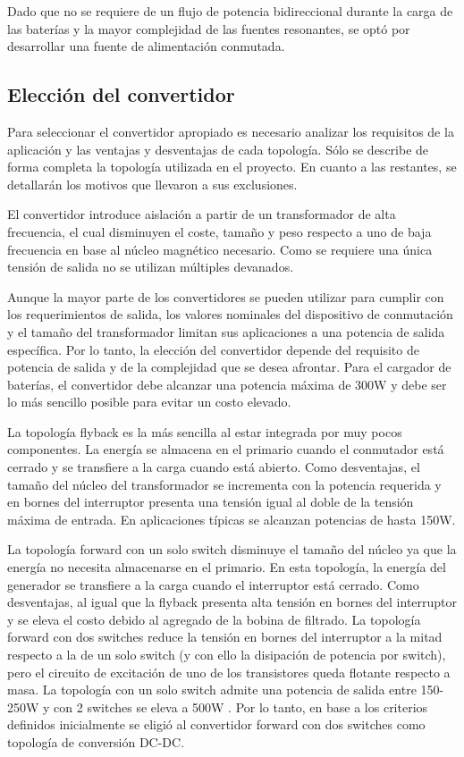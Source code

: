 Dado que no se requiere de un flujo de potencia bidireccional durante la carga de las baterías y la mayor complejidad de las fuentes resonantes, 
se optó por desarrollar una fuente de alimentación conmutada. 

\subsection{Elección del convertidor}

Para seleccionar el convertidor apropiado es necesario analizar los requisitos de la aplicación y las ventajas y desventajas de cada topología.  
Sólo se describe de forma completa la topología utilizada en el proyecto. En cuanto a las restantes, se detallarán los motivos que llevaron a sus exclusiones.  

El convertidor introduce aislación a partir de un transformador de alta frecuencia,
el cual disminuyen el coste, tamaño y peso respecto a uno de baja frecuencia en base al núcleo magnético necesario.
Como se requiere una única tensión de salida no se utilizan múltiples devanados.

Aunque la mayor parte de los convertidores se pueden utilizar para cumplir con los requerimientos de salida, 
los valores nominales del dispositivo de conmutación y el tamaño del transformador limitan sus aplicaciones a una potencia de salida específica. 
Por lo tanto, la elección del convertidor depende del requisito de potencia de salida y de la complejidad que se desea afrontar.
Para el cargador de baterías, el convertidor debe alcanzar una potencia máxima de 300W y debe ser lo más sencillo posible para evitar un costo elevado. 

La topología flyback es la más sencilla al estar integrada por muy pocos componentes. 
La energía se almacena en el primario cuando el conmutador está cerrado y se transfiere a la carga cuando está abierto.
Como desventajas, el tamaño del núcleo del transformador se incrementa con la potencia requerida y en bornes del
interruptor presenta una tensión igual al doble de la tensión máxima de entrada.
En aplicaciones típicas se alcanzan potencias de hasta 150W.

La topología forward con un solo switch disminuye el tamaño del núcleo ya que la energía no necesita almacenarse en el primario.
En esta topología, la energía del generador se transfiere a la carga cuando el interruptor está cerrado.
Como desventajas, al igual que la flyback presenta alta tensión en bornes del interruptor y se eleva el costo debido al agregado de la bobina de filtrado.
La topología forward con dos switches reduce la tensión en bornes del interruptor a la mitad respecto a la de un solo switch (y con ello la disipación de potencia por switch), 
pero el circuito de excitación de uno de los transistores queda flotante respecto a masa. 
La topología con un solo switch admite una potencia de salida entre 150-250W y con 2 switches se eleva a 500W \cite{hart}. 
Por lo tanto, en base a los criterios definidos inicialmente se eligió al convertidor forward con dos switches como topología de conversión DC-DC. 

